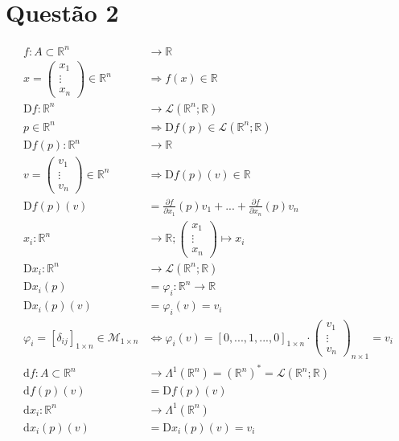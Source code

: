 \documentclass[12pt,a4paper]{article}
\begin{document}
	\section{Quest\~ao 2}
		\begin{align}
			f : A \subset \mathbb{R}^n &\rightarrow \mathbb{R} \\
			x = \begin{pmatrix} x_1 \\ \vdots \\ x_n \end{pmatrix} \in \mathbb{R}^n &\Rightarrow f(x) \in \mathbb{R} \\
			\mathrm{D}f : \mathbb{R}^n &\rightarrow \mathcal{L}(\mathbb{R}^n ; \mathbb{R}) \\
			p \in \mathbb{R}^n &\Rightarrow \mathrm{D}f(p) \in \mathcal{L}(\mathbb{R}^n ; \mathbb{R}) \\
			\mathrm{D}f(p) : \mathbb{R}^n &\rightarrow \mathbb{R} \\
			v = \begin{pmatrix} v_1 \\ \vdots \\ v_n \end{pmatrix} \in \mathbb{R}^n &\Rightarrow \mathrm{D}f(p)(v) \in \mathbb{R} \\
			\mathrm{D}f(p)(v) &= \frac{\partial f}{\partial x_1} (p) v_1 + ... + \frac{\partial f}{\partial x_n} (p) v_n \\
			x_i : \mathbb{R}^n &\rightarrow \mathbb{R} ; \begin{pmatrix} x_1 \\ \vdots \\ x_n \end{pmatrix} \mapsto x_i \\
			\mathrm{D}x_i : \mathbb{R}^n &\rightarrow \mathcal{L}(\mathbb{R}^n ; \mathbb{R}) \\
			\mathrm{D}x_i (p) &= \varphi_i : \mathbb{R}^n \rightarrow \mathbb{R} \\
			\mathrm{D}x_i (p) (v) &= \varphi_i (v) = v_i \\
			\varphi_i = [\delta_{ij}]_{1 \times n} \in \mathcal{M}_{1 \times n} &\Leftrightarrow \varphi_i (v) = [0,...,1,...,0]_{1 \times n} \cdot \begin{pmatrix} v_1 \\ \vdots \\ v_n \end{pmatrix}_{n \times 1} = v_i \\
			\mathrm{d}f : A \subset \mathbb{R}^n &\rightarrow \Lambda^1(\mathbb{R}^n) = (\mathbb{R}^n)^* = \mathcal{L}(\mathbb{R}^n ; \mathbb{R}) \\
			\mathrm{d}f (p) (v) &= \mathrm{D}f(p) (v) \\
			\mathrm{d}x_i : \mathbb{R}^n &\rightarrow \Lambda^1(\mathbb{R}^n) \\
			\mathrm{d}x_i (p) (v) &= \mathrm{D}x_i(p) (v) = v_i
		\end{align}
\end{document}
